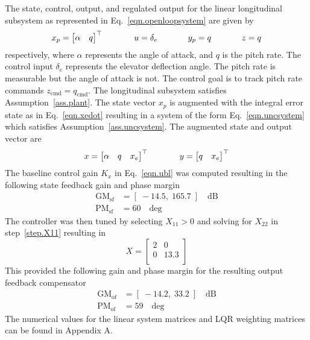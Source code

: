 \documentclass[]{../sty/JGCD}
\theoremstyle{examplestyle}
\begin{document}
  The state, control, output, and regulated output for the linear longitudinal subsystem as represented in Eq.\ \eqref{eqn.openloopsystem} are given by
  \begin{equation*}
    x_{p}=
    \begin{bmatrix}
      \alpha & q
    \end{bmatrix}^{\top}
    \hspace{0.5in}
    u=\delta_{e}
    \hspace{0.5in}
    y_{p}=q
    \hspace{0.5in}
    z=q
  \end{equation*}
  respectively, where $\alpha$ represents the angle of attack, and $q$ is the pitch rate.
  The control input $\delta_{e}$ represents the elevator deflection angle.
  The pitch rate is measurable but the angle of attack is not.
  The control goal is to track pitch rate commands $z_{\text{cmd}}=q_{\text{cmd}}$.
  The longitudinal subsystem satisfies Assumption~\ref{ass.plant}.
  The state vector $x_{p}$ is augmented with the integral error state as in Eq.\ \eqref{eqn.xedot} resulting in a system of the form Eq.\ \eqref{eqn.uncsystem} which satisfies Assumption~\ref{ass.uncsystem}.
  The augmented state and output vector are
  \begin{equation*}
    x=
    \begin{bmatrix}
      \alpha & q & x_{e}
    \end{bmatrix}^{\top}
    \hspace{0.5in}
    y=
    \begin{bmatrix}
      q & x_{e}
    \end{bmatrix}^{\top}
  \end{equation*}
  The baseline control gain $K_{x}$ in Eq.\ \eqref{eqn.ubl} was computed resulting in the following state feedback gain and phase margin
  \begin{align*}
    \text{GM}_{\text{sf}}&=[\;-14.5,\; 165.7\;] \quad \text{dB}\\
    \text{PM}_{\text{sf}}&=60 \quad \text{deg}
  \end{align*}
  The controller was then tuned by selecting $X_{11}>0$ and solving for $X_{22}$ in step~\ref{step.X11} resulting in
  \begin{equation*}
    X=
    \left[
    \begin{array}{cc}
      2 & 0 \\
      0 & 13.3 \\
    \end{array}\right]
  \end{equation*}
  This provided the following gain and phase margin for the resulting output feedback compensator
  \begin{align*}
    \text{GM}_{\text{of}}&=[\; -14.2 ,\; 33.2 \;] \quad \text{dB}\\
    \text{PM}_{\text{of}}&=59 \quad \text{deg}
  \end{align*}
  The numerical values for the linear system matrices and LQR weighting matrices can be found in Appendix A.
\end{document}
